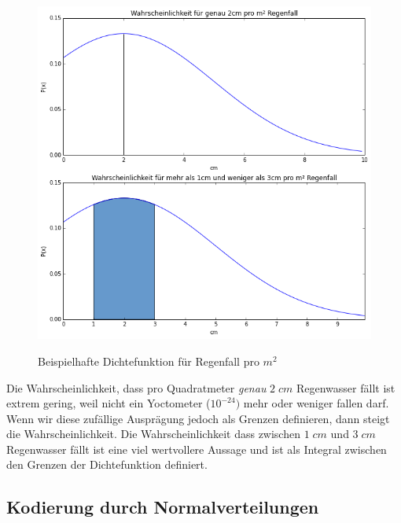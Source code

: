             \begin{figure}[H]
                    \begin{center}
                        \hspace{-1cm}
                        \includegraphics[scale=0.6]{../pictures/diagrams/rainfall-pdf.png}\\
                        \caption{Beispielhafte Dichtefunktion für Regenfall pro $m^{2}$}\label{fig:rainfall-pdf}
                    \end{center}
            \end{figure}
            \noindent
            Die Wahrscheinlichkeit, dass pro Quadratmeter \textit{genau} $2\;cm$ Regenwasser fällt ist extrem gering, weil nicht ein Yoctometer ($10^{-24})$ mehr oder weniger fallen darf. Wenn wir diese zufällige Ausprägung jedoch als Grenzen definieren, dann steigt die Wahrscheinlichkeit. Die Wahrscheinlichkeit dass zwischen $1\;cm$ und $3\;cm$ Regenwasser fällt ist eine viel wertvollere Aussage und ist als Integral zwischen den Grenzen der Dichtefunktion definiert.\\

            \subsection{Kodierung durch Normalverteilungen}

